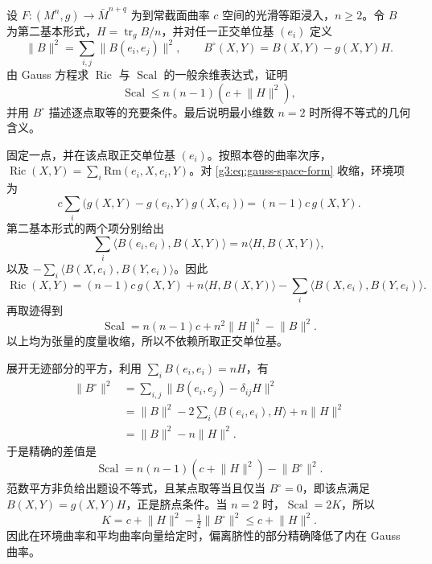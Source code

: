 
\begin{exercise}\label{g3:ex:submanifold-ricci-scalar-contractions}
	设 \(F\colon(M^n,g)\to\bar M^{n+q}\) 为到常截面曲率 \(c\) 空间的光滑等距浸入，\(n\ge2\)。令 \(B\) 为第二基本形式，\(H=\operatorname{tr}_gB/n\)，并对任一正交单位基 \((e_i)\) 定义
	\[
		\lVert B\rVert^2=\sum_{i,j}\lVert B(e_i,e_j)\rVert^2,
		\qquad B^\circ(X,Y)=B(X,Y)-g(X,Y)H.
	\]
	由 Gauss 方程求 \(\operatorname{Ric}\) 与 \(\operatorname{Scal}\) 的一般余维表达式，证明
	\[
		\operatorname{Scal}\le n(n-1)(c+\lVert H\rVert^2),
	\]
	并用 \(B^\circ\) 描述逐点取等的充要条件。最后说明最小维数 \(n=2\) 时所得不等式的几何含义。
\end{exercise}
\begin{solution}
	固定一点，并在该点取正交单位基 \((e_i)\)。按照本卷的曲率次序，\(\operatorname{Ric}(X,Y)=\sum_i\mathrm{Rm}(e_i,X,e_i,Y)\)。对 \eqref{g3:eq:gauss-space-form} 收缩，环境项为
	\[
		c\sum_i\bigl(g(X,Y)-g(e_i,Y)g(X,e_i)\bigr)
		=(n-1)c\,g(X,Y).
	\]
	第二基本形式的两个项分别给出
	\[
		\sum_i\langle B(e_i,e_i),B(X,Y)\rangle
		=n\langle H,B(X,Y)\rangle,
	\]
	以及 \(-\sum_i\langle B(X,e_i),B(Y,e_i)\rangle\)。因此
	\[
		\operatorname{Ric}(X,Y)
		=(n-1)c\,g(X,Y)+n\langle H,B(X,Y)\rangle
		-\sum_i\langle B(X,e_i),B(Y,e_i)\rangle.
	\]
	再取迹得到
	\[
		\operatorname{Scal}
		=n(n-1)c+n^2\lVert H\rVert^2-\lVert B\rVert^2.
	\]
	以上均为张量的度量收缩，所以不依赖所取正交单位基。

	展开无迹部分的平方，利用 \(\sum_iB(e_i,e_i)=nH\)，有
	\[
		\begin{aligned}
		\lVert B^\circ\rVert^2
		&=\sum_{i,j}\lVert B(e_i,e_j)-\delta_{ij}H\rVert^2\\
		&=\lVert B\rVert^2-2\sum_i\langle B(e_i,e_i),H\rangle
		+n\lVert H\rVert^2\\
		&=\lVert B\rVert^2-n\lVert H\rVert^2.
		\end{aligned}
	\]
	于是精确的差值是
	\[
		\operatorname{Scal}
		=n(n-1)(c+\lVert H\rVert^2)-\lVert B^\circ\rVert^2.
	\]
	范数平方非负给出题设不等式，且某点取等当且仅当 \(B^\circ=0\)，即该点满足 \(B(X,Y)=g(X,Y)H\)，正是脐点条件。当 \(n=2\) 时，\(\operatorname{Scal}=2K\)，所以
	\[
		K=c+\lVert H\rVert^2-\tfrac12\lVert B^\circ\rVert^2
		\le c+\lVert H\rVert^2.
	\]
	因此在环境曲率和平均曲率向量给定时，偏离脐性的部分精确降低了内在 Gauss 曲率。
\end{solution}

